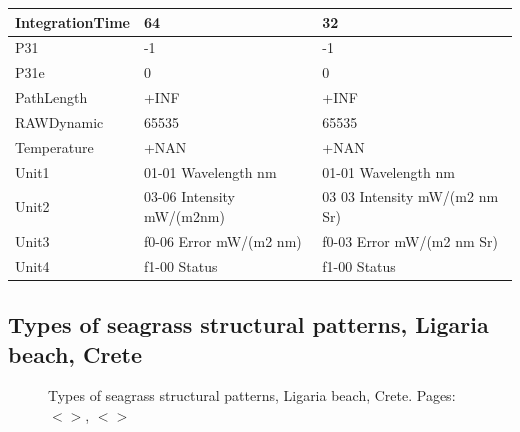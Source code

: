 \documentclass[11pt]{article}
\begin{document}
\begin{appendices}
\begin{table}[H]
\begin{tabular}{| p{3cm} | p{3cm} | p{5cm} |}
	   IntegrationTime & 64 & 32 \\ \hline
	    P31 & -1 & -1 \\ \hline
	   P31e & 0 & 0 \\ \hline
	   PathLength & +INF & +INF \\ \hline
	   RAWDynamic & 65535 & 65535 \\ \hline
	   Temperature & +NAN & +NAN \\ \hline
	   Unit1 & 01-01 Wavelength nm &  01-01 Wavelength nm \\ \hline
	   Unit2 & 03-06 Intensity mW/(m2nm) & 03 03 Intensity mW/(m2 nm Sr) \\ \hline
	   Unit3 & f0-06 Error mW/(m2 nm) & f0-03 Error mW/(m2 nm Sr) \\ \hline
	  Unit4 & f1-00 Status & f1-00 Status \\ \hline
	\end{tabular}
\end{table}
\pagebreak

\subsection[Types of seagrass structural patterns]{Types of seagrass structural patterns, Ligaria beach, Crete}

\begin{figure}[h]
	\centering
	\hspace{1mm}
	\hspace{1mm}
	\caption{Types of seagrass structural patterns, Ligaria beach, Crete.  Pages: $<$\pageref{page-27}$>$, $<$\pageref{page-28}$>$}
	\label{fig:A.3}
\end{figure}


\end{appendices}
\end{document}
